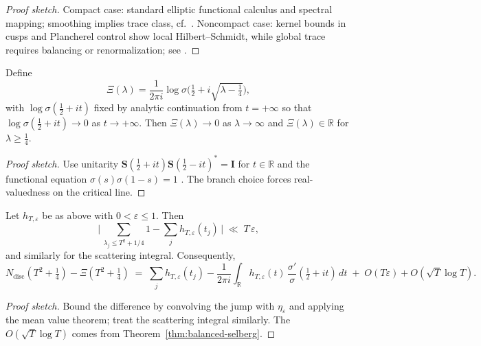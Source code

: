 \begin{proof}[Proof sketch]
Compact case: standard elliptic functional calculus and spectral mapping; smoothing implies trace class, cf.\ \cite{Seeley1967}. Noncompact case: kernel bounds in cusps and Plancherel control show local Hilbert–Schmidt, while global trace requires balancing or renormalization; see \cite{Hejhal1983II,JorgensonLang}.
\end{proof}

\begin{lemma}
\label{lem:branch}
Define
\[
  \Xi(\lambda)=\frac{1}{2\pi i}\log \sigma\!\big(\tfrac12+i\sqrt{\lambda-\tfrac14}\big),
\]
with $\log \sigma(\tfrac12+it)$ fixed by analytic continuation from $t=+\infty$ so that $\log\sigma(\tfrac12+it)\to 0$ as $t\to+\infty$. Then $\Xi(\lambda)\to 0$ as $\lambda\to\infty$ and $\Xi(\lambda)\in\mathbb R$ for $\lambda\ge \tfrac14$.
\end{lemma}

\begin{proof}[Proof sketch]
Use unitarity $\mathbf S(\tfrac12+it)\mathbf S(\tfrac12-it)^\ast=\mathbf I$ for $t\in\mathbb R$ and the functional equation $\sigma(s)\sigma(1-s)=1$ \cite{LaxPhillips1976,Hejhal1983II}. The branch choice forces real-valuedness on the critical line.
\end{proof}

\begin{lemma}
\label{lem:indicator-error}
Let $h_{T,\varepsilon}$ be as above with $0<\varepsilon\le 1$. Then
\[
  \big|\,\sum_{\lambda_j\le T^2+1/4}1 - \sum_j h_{T,\varepsilon}(t_j)\,\big|
  \;\ll\; T\,\varepsilon,
\]
and similarly for the scattering integral. Consequently,
\[
  N_{\mathrm{disc}}(T^2+\tfrac14) - \Xi(T^2+\tfrac14)
  \;=\; \sum_j h_{T,\varepsilon}(t_j) - \frac{1}{2\pi i}\int_{\mathbb R} h_{T,\varepsilon}(t)\,\frac{\sigma'}{\sigma}(\tfrac12+it)\,dt \;+\; O(T\varepsilon)+O(\sqrt{T}\log T).
\]
\end{lemma}

\begin{proof}[Proof sketch]
Bound the difference by convolving the jump with $\eta_\varepsilon$ and applying the mean value theorem; treat the scattering integral similarly. The $O(\sqrt{T}\log T)$ comes from Theorem~\ref{thm:balanced-selberg}.
\end{proof}



